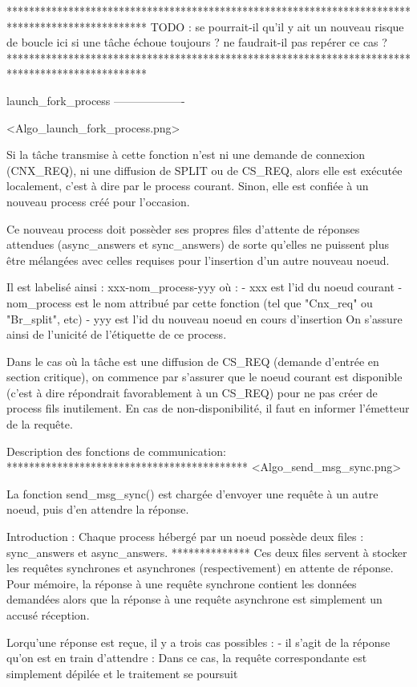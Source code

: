 *************************************************************************************************
TODO : se pourrait-il qu'il y ait un nouveau risque de boucle ici si une tâche échoue toujours ?
       ne faudrait-il pas repérer ce cas ?
*************************************************************************************************


launch_fork_process
-------------------

<Algo_launch_fork_process.png>

Si la tâche transmise à cette fonction n'est ni une demande de connexion (CNX_REQ), ni une
diffusion de SPLIT ou de CS_REQ, alors elle est exécutée localement, c'est à dire par le process
courant. Sinon, elle est confiée à un nouveau process créé pour l'occasion.

Ce nouveau process doit possèder ses propres files d'attente de réponses attendues (async_answers et
sync_answers) de sorte qu'elles ne puissent plus être mélangées avec celles requises pour l'insertion
d'un autre nouveau noeud.

Il est labelisé ainsi : xxx-nom_process-yyy où :
  - xxx est l'id du noeud courant
  - nom_process est le nom attribué par cette fonction (tel que "Cnx_req" ou "Br_split", etc)
  - yyy est l'id du nouveau noeud en cours d'insertion
On s'assure ainsi de l'unicité de l'étiquette de ce process.

Dans le cas où la tâche est une diffusion de CS_REQ (demande d'entrée en section critique), on
commence par s'assurer que le noeud courant est disponible (c'est à dire répondrait favorablement à
un CS_REQ) pour ne pas créer de process fils inutilement. En cas de non-disponibilité, il faut en
informer l'émetteur de la requête.

Description des fonctions de communication:
*******************************************
<Algo_send_msg_sync.png>

La fonction send_msg_sync() est chargée d'envoyer une requête à un autre noeud, puis d'en attendre
la réponse.

Introduction : Chaque process hébergé par un noeud possède deux files : sync_answers et async_answers.
**************
Ces deux files servent à stocker les requêtes synchrones et asynchrones (respectivement) en attente
de réponse. Pour mémoire, la réponse à une requête synchrone contient les données demandées alors
que la réponse à une requête asynchrone est simplement un accusé réception.

Lorqu'une réponse est reçue, il y a trois cas possibles :
- il s'agit de la réponse qu'on est en train d'attendre :
  Dans ce cas, la requête correspondante est simplement dépilée et le traitement se poursuit


